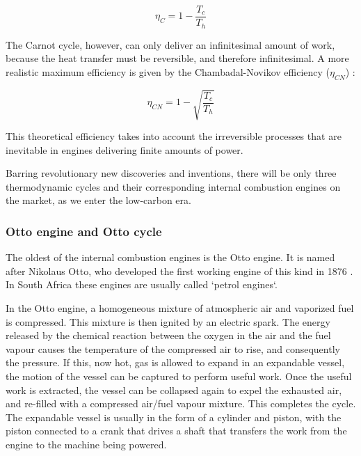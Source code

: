 \begin{equation}
	\eta_{C} = 1 - \frac{T_c}{T_h}
\label{eqn:Carnot}
\end{equation}

The Carnot cycle, however, can only deliver an infinitesimal amount of work,
because the heat transfer must be reversible, and therefore infinitesimal. A
more realistic maximum efficiency is given by the Chambadal-Novikov efficiency
(\(\eta_{CN}\)) \autocite{Hoffmann2008}:

\begin{equation}
	\eta_{CN} = 1 - \sqrt{\frac{T_c}{T_h}}
\label{eqn:Chambadal-Novikov}
\end{equation}

This theoretical efficiency takes into account the irreversible processes that
are inevitable in engines delivering finite amounts of power.

Barring revolutionary new discoveries and inventions, there will be only three
thermodynamic cycles and their corresponding internal combustion engines on the
market, as we enter the low-carbon era.

\subsubsection{Otto engine and Otto cycle}

The oldest of the internal combustion engines is the Otto engine. It is named
after Nikolaus Otto, who developed the first working engine of this kind in 1876
\autocite[Chapter 9]{Cummins1989}. In South Africa these engines are usually
called `petrol engines`.

In the Otto engine, a homogeneous mixture of atmospheric air and vaporized fuel
is compressed. This mixture is then ignited by an electric spark. The energy
released by the chemical reaction between the oxygen in the air and the fuel
vapour causes the temperature of the compressed air to rise, and consequently
the pressure. If this, now hot, gas is allowed to expand in an expandable
vessel, the motion of the vessel can be captured to perform useful work. Once
the useful work is extracted, the vessel can be collapsed again to expel the
exhausted air, and re-filled with a compressed air/fuel vapour mixture. This
completes the cycle. The expandable vessel is usually in the form of a cylinder
and piston, with the piston connected to a crank that drives a shaft that
transfers the work from the engine to the machine being powered.

